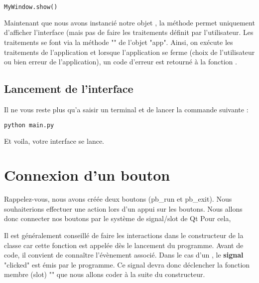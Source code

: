 \begin{lstlisting}[language=Python]
	MyWindow.show()
\end{lstlisting}

Maintenant que nous avons instancié notre objet , la méthode  permet uniquement d'afficher l'interface (mais pas de faire les traitements définit par l'utilisateur. \newline
Les traitements se font via la méthode "" de l'objet "app".
Ainsi, on exécute les traitements de l'application et lorsque l'application se ferme (choix de l'utilisateur ou bien erreur de l'application), un code d'erreur est retourné à la fonction .

\subsection{Lancement de l'interface}

Il ne vous reste plus qu'a saisir un terminal et de lancer la commande suivante : 
\begin{lstlisting}[language=bash]
	python main.py
\end{lstlisting}


Et voila, votre interface se lance.



\section{Connexion d'un bouton}\label{exemple_signal}

Rappelez-vous, nous avons créée deux boutons (pb\_run et pb\_exit). Nous souhaiterions effectuer une action lors d'un appui sur les boutons. \newline
Nous allons donc connecter nos boutons par le système de signal/slot de Qt
Pour cela, \newline

Il est généralement conseillé de faire les interactions dans le constructeur de la classe car cette fonction est appelée dès le lancement du programme. \newline
Avant de code, il convient de connaître l'évènement associé. Dans le cas d'un , le \textbf{signal} "clicked" est émis par le programme. \newline
Ce signal devra donc déclencher la fonction membre (slot) "" que nous allons coder à la suite du constructeur. \newline

